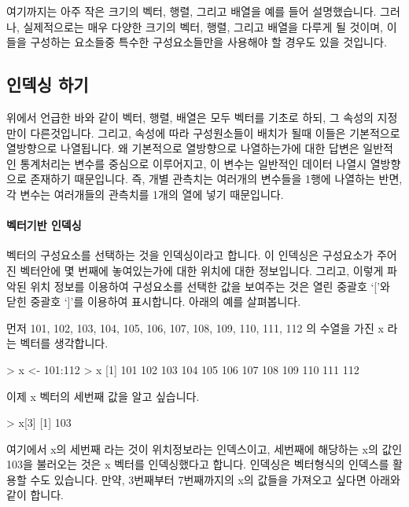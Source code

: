 \documentclass{book}
\begin{document}
여기까지는 아주 작은 크기의 벡터, 행렬, 그리고 배열을 예를 들어 설명했습니다.
그러나, 실제적으로는 매우 다양한 크기의 벡터, 행렬, 그리고 배열을 다루게 될 것이며, 이들을 구성하는 요소들중 특수한 구성요소들만을 사용해야 할 경우도 있을 것입니다.  

\subsection{인덱싱 하기}

위에서 언급한 바와 같이 벡터, 행렬, 배열은 모두 벡터를 기초로 하되, 그 속성의 지정만이 다른것입니다.
그리고, 속성에 따라 구성원소들이 배치가 될때 이들은 기본적으로 열방향으로 나열됩니다. 
왜 기본적으로 열방향으로 나열하는가에 대한 답변은 일반적인 통계처리는 변수를 중심으로 이루어지고, 이 변수는 일반적인 데이터 나열시 열방향으로 존재하기 때문입니다. 
즉, 개별 관측치는 여러개의 변수들을 1행에 나열하는 반면, 각 변수는 여러개들의 관측치를 1개의 열에 넣기 때문입니다.

\paragraph{벡터기반 인덱싱} 벡터의 구성요소를 선택하는 것을 인덱싱이라고 합니다. 
이 인덱싱은 구성요소가 주어진 벡터안에 몇 번째에 놓여있는가에 대한 위치에 대한 정보입니다.
그리고, 이렇게 파악된 위치 정보를 이용하여 구성요소를 선택한 값을 보여주는 것은 열린 중괄호 `['와 닫힌 중괄호 `]'를 이용하여 표시합니다. 
아래의 예를 살펴봅니다. 

먼저 101, 102, 103, 104, 105, 106, 107, 108, 109, 110, 111, 112 의 수열을 가진 x 라는 벡터를 생각합니다. 
 
\begin{Schunk}
\begin{Soutput}
> x <- 101:112
> x
 [1] 101 102 103 104 105 106 107 108 109 110 111 112
\end{Soutput}
\end{Schunk}

이제 x 벡터의 세번째 값을 알고 싶습니다. 

\begin{Schunk}
\begin{Soutput}
> x[3]
[1] 103
\end{Soutput}
\end{Schunk}

여기에서 x의 세번째 라는 것이 위치정보라는 인덱스이고, 세번째에 해당하는 x의 값인 103을 불러오는 것은 x 벡터를 인덱싱했다고 합니다. 
인덱싱은 벡터형식의 인덱스를 활용할 수도 있습니다.
만약, 3번째부터 7번째까지의 x의 값들을 가져오고 싶다면 아래와 같이 합니다. 
\end{document}
